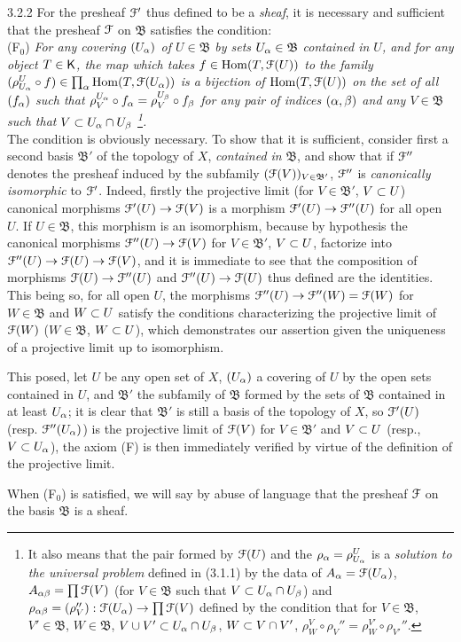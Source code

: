 \documentclass[../main.tex]{subfiles}
\begin{document}
\begin{cx}{3.2.2}
For the presheaf $\mathcal{F}'$ thus defined to be a \emph{sheaf}, it is necessary and sufficient
that the presheaf $\mathcal{F}$ on $\mathfrak{B}$ satisfies the condition:\\

  (F$_0$) \emph{For any covering $(U_\alpha)$ of $U\in\mathfrak{B}$ by sets $U_\alpha\in\mathfrak{B}$
  contained in $U$, and for any object $T\in\mathsf{K}$, the map which takes $f\in\operatorname{Hom}(T,\mathcal{F}(U))$
  to the family $(\rho_{U_\alpha}^U\circ f)\in\prod_\alpha\operatorname{Hom}(T,\mathcal{F}(U_\alpha))$ is a bijection of
  $\operatorname{Hom}(T,\mathcal{F}(U))$ on the set of all $(f_\alpha)$ such that $\rho_V^{U_\alpha}\circ f_\alpha=\rho_V^{U_\beta}\circ f_\beta$
  for any pair of indices $(\alpha,\beta)$ and any $V\in\mathfrak{B}$ such that $V\subset U_\alpha\cap U_\beta$
  \footnote{It also means that the pair formed by $\mathcal{F}(U)$ and the $\rho_\alpha=\rho_{U_\alpha}^U$
  is a \emph{solution to the universal problem} defined in (3.1.1) by the data of $A_\alpha=\mathcal{F}(U_\alpha)$,
  $A_{\alpha\beta}=\prod\mathcal{F}(V)$ (for $V\in\mathfrak{B}$ such that $V\subset U_\alpha\cap U_\beta$) and
  $\rho_{\alpha\beta}=(\rho_V''):\mathcal{F}(U_\alpha)\to\prod\mathcal{F}(V)$ defined by the condition that for
  $V\in\mathfrak{B}$, $V'\in\mathfrak{B}$, $W\in\mathfrak{B}$, $V\cup V'\subset U_\alpha\cap U_\beta$,
  $W\subset V\cap V'$, $\rho_W^V\circ\rho_V''=\rho_W^{V'}\circ\rho_{V'}''$.}.}\\

The condition is obviously necessary. To show that it is sufficient,
consider first a second basis $\mathfrak{B}'$ of the topology of $X$, \emph{contained in} $\mathfrak{B}$, and
show that if $\mathcal{F}''$ denotes the presheaf induced by the subfamily $(\mathcal{F}(V))_{V\in\mathfrak{B}'}$, $\mathcal{F}''$ is
\emph{canonically isomorphic} to $\mathcal{F}'$. Indeed, firstly the projective limit (for $V\in\mathfrak{B}'$,
$V\subset U$) canonical morphisms ${\mathcal{F}'(U)\to\mathcal{F}(V)}$ is a morphism ${\mathcal{F}'(U)\to\mathcal{F}''(U)}$
for all open $U$. If $U\in\mathfrak{B}$, this morphism is an isomorphism, because by hypothesis
the canonical morphisms ${\mathcal{F}''(U)\to\mathcal{F}(V)}$ for $V\in\mathfrak{B}'$, $V\subset U$, factorize into
${\mathcal{F}''(U)\to\mathcal{F}(U)\to\mathcal{F}(V)}$, and it is immediate to see that the composition of morphisms
${\mathcal{F}(U)\to\mathcal{F}''(U)}$ and ${\mathcal{F}''(U)\to\mathcal{F}(U)}$ thus defined are the identities. This being so, for
all open $U$, the morphisms ${\mathcal{F}''(U)\to\mathcal{F}''(W)=\mathcal{F}(W)}$ for $W\in\mathfrak{B}$ and $W\subset U$ satisfy
the conditions characterizing the projective limit of $\mathcal{F}(W)$ ($W\in\mathfrak{B}$, $W\subset U$), which demonstrates
our assertion given the uniqueness of a projective limit up to isomorphism.

This posed, let $U$ be any open set of $X$, $(U_\alpha)$ a covering of $U$ by
the open sets contained in $U$, and $\mathfrak{B}'$ the subfamily of $\mathfrak{B}$ formed by the sets
of $\mathfrak{B}$ contained in at least $U_\alpha$; it is clear that $\mathfrak{B}'$ is still a basis
of the topology of $X$, so $\mathcal{F}'(U)$ (resp. $\mathcal{F}''(U_\alpha)$) is the projective limit of $\mathcal{F}(V)$ for $V\in\mathfrak{B}'$
and $V\subset U$ (resp., $V\subset U_\alpha$), the axiom (F) is then immediately verified by virtue of the definition of the
projective limit.

When (F$_0$) is satisfied, we will say by abuse of language that the presheaf $\mathcal{F}$
on the basis $\mathfrak{B}$ is a sheaf.
\end{cx}
\end{document}
